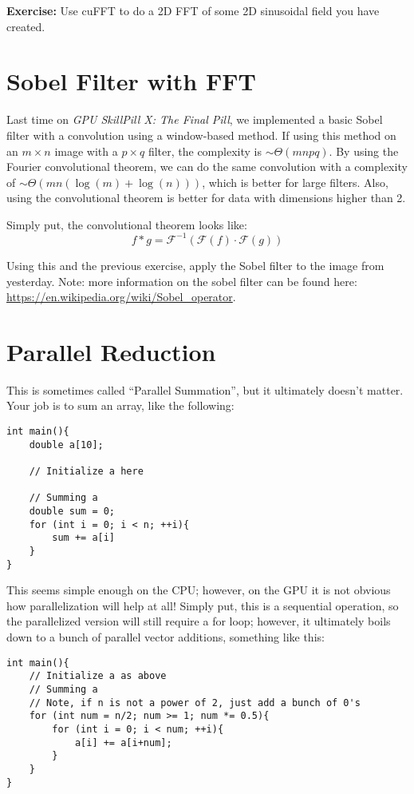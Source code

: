 \documentclass[11pt]{article}
\begin{document}
\textbf{Exercise:} Use cuFFT to do a 2D FFT of some 2D sinusoidal field you have created.

\newpage

\section*{Sobel Filter with FFT}

Last time on \textit{GPU SkillPill X: The Final Pill}, we implemented a basic Sobel filter with a convolution using a window-based method. If using this method on an $m \times n$ image with a $p \times q$ filter, the complexity is $\sim \Theta(mnpq)$. By using the Fourier convolutional theorem, we can do the same convolution with a complexity of $\sim \Theta(mn(\log (m) + \log (n)))$, which is better for large filters. Also, using the convolutional theorem is better for data with dimensions higher than 2.

Simply put, the convolutional theorem looks like:
$$
f * g = \mathscr{F}^{-1}(\mathscr{F}(f)\cdot\mathscr{F}(g))
$$

Using this and the previous exercise, apply the Sobel filter to the image from yesterday. Note: more information on the sobel filter can be found here: \url{https://en.wikipedia.org/wiki/Sobel_operator}.
\newpage

\section*{Parallel Reduction}

This is sometimes called ``Parallel Summation'', but it ultimately doesn't matter. Your job is to sum an array, like the following:

\begin{lstlisting}
int main(){
    double a[10];
    
    // Initialize a here
    
    // Summing a
    double sum = 0;
    for (int i = 0; i < n; ++i){
        sum += a[i]
    }
}
\end{lstlisting}

This seems simple enough on the CPU; however, on the GPU it is not obvious how parallelization will help at all! Simply put, this is a sequential operation, so the parallelized version will still require a for loop; however, it ultimately boils down to a bunch of parallel vector additions, something like this:

\begin{lstlisting}
int main(){
    // Initialize a as above
    // Summing a
    // Note, if n is not a power of 2, just add a bunch of 0's
    for (int num = n/2; num >= 1; num *= 0.5){
        for (int i = 0; i < num; ++i){
            a[i] += a[i+num];
        }
    }
}
\end{lstlisting}
\end{document}
